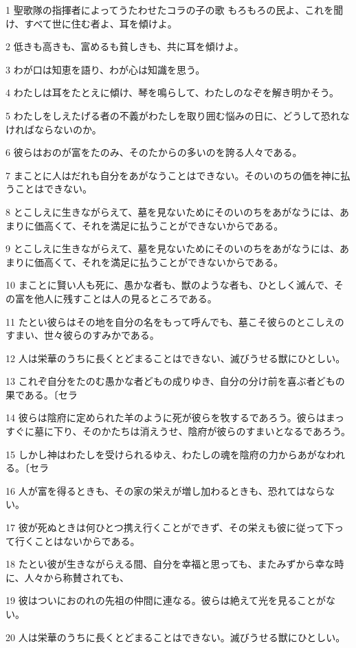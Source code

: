 \par 1 聖歌隊の指揮者によってうたわせたコラの子の歌 もろもろの民よ、これを聞け、すべて世に住む者よ、耳を傾けよ。
\par 2 低きも高きも、富めるも貧しきも、共に耳を傾けよ。
\par 3 わが口は知恵を語り、わが心は知識を思う。
\par 4 わたしは耳をたとえに傾け、琴を鳴らして、わたしのなぞを解き明かそう。
\par 5 わたしをしえたげる者の不義がわたしを取り囲む悩みの日に、どうして恐れなければならないのか。
\par 6 彼らはおのが富をたのみ、そのたからの多いのを誇る人々である。
\par 7 まことに人はだれも自分をあがなうことはできない。そのいのちの価を神に払うことはできない。
\par 8 とこしえに生きながらえて、墓を見ないためにそのいのちをあがなうには、あまりに価高くて、それを満足に払うことができないからである。
\par 9 とこしえに生きながらえて、墓を見ないためにそのいのちをあがなうには、あまりに価高くて、それを満足に払うことができないからである。
\par 10 まことに賢い人も死に、愚かな者も、獣のような者も、ひとしく滅んで、その富を他人に残すことは人の見るところである。
\par 11 たとい彼らはその地を自分の名をもって呼んでも、墓こそ彼らのとこしえのすまい、世々彼らのすみかである。
\par 12 人は栄華のうちに長くとどまることはできない、滅びうせる獣にひとしい。
\par 13 これぞ自分をたのむ愚かな者どもの成りゆき、自分の分け前を喜ぶ者どもの果である。〔セラ
\par 14 彼らは陰府に定められた羊のように死が彼らを牧するであろう。彼らはまっすぐに墓に下り、そのかたちは消えうせ、陰府が彼らのすまいとなるであろう。
\par 15 しかし神はわたしを受けられるゆえ、わたしの魂を陰府の力からあがなわれる。〔セラ
\par 16 人が富を得るときも、その家の栄えが増し加わるときも、恐れてはならない。
\par 17 彼が死ぬときは何ひとつ携え行くことができず、その栄えも彼に従って下って行くことはないからである。
\par 18 たとい彼が生きながらえる間、自分を幸福と思っても、またみずから幸な時に、人々から称賛されても、
\par 19 彼はついにおのれの先祖の仲間に連なる。彼らは絶えて光を見ることがない。
\par 20 人は栄華のうちに長くとどまることはできない。滅びうせる獣にひとしい。

